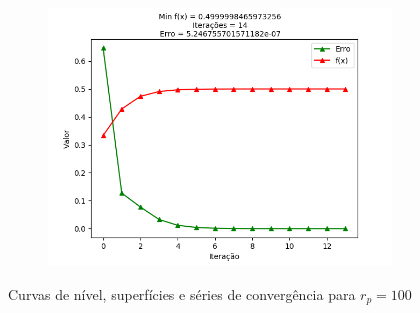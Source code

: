 \documentclass[a4paper, 12pt]{article}
\begin{document}
\begin{figure}[H]
\begin{subfigure}{0.3\textwidth}
  \includegraphics[width=\linewidth]{1/A/RP1/convergencia.png}
\end{subfigure}
\caption{Curvas de nível, superfícies e séries de convergência para $r_p = 100$}
\label{fig:Q1ARP100}
\end{figure}
\end{document}
